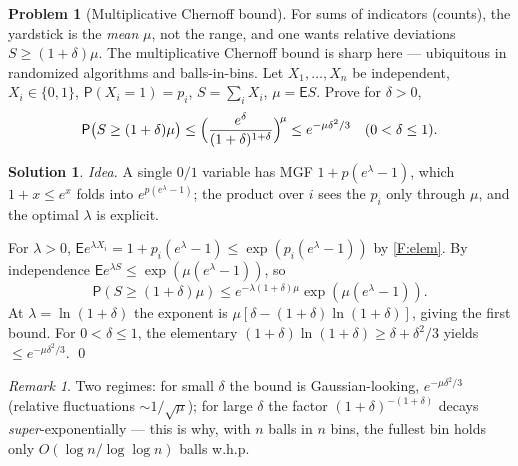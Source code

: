 \documentclass[14pt]{extarticle}
\theoremstyle{definition}
\newtheorem{exercise}{Problem}
\newtheorem*{solution}{Solution}
\theoremstyle{remark}
\newtheorem*{remark}{Remark}
\newcommand\expc{\mathsf{E}}
\newcommand\prb{\mathsf{P}}
\begin{document}
\begin{exercise}[Multiplicative Chernoff bound]\label{prob:multcher}
For sums of indicators (counts), the yardstick is the \emph{mean} $\mu$, not the range, and one wants relative deviations $S\ge(1+\delta)\mu$. The multiplicative Chernoff bound is sharp here --- ubiquitous in randomized algorithms and balls-in-bins. Let $X_1,\ldots,X_n$ be independent, $X_i\in\{0,1\}$, $\prb(X_i=1)=p_i$, $S=\sum_iX_i$, $\mu=\expc S$. Prove for $\delta>0$,
\[
\prb\bigl(S\ge(1+\delta)\mu\bigr)\le\Bigl(\frac{e^\delta}{(1+\delta)^{1+\delta}}\Bigr)^{\!\mu}\le e^{-\mu\delta^2/3}\quad(0<\delta\le1).
\]
\end{exercise}
\begin{solution}
\emph{Idea.} A single $0/1$ variable has MGF $1+p(e^\lambda-1)$, which $1+x\le e^x$ folds into $e^{p(e^\lambda-1)}$; the product over $i$ sees the $p_i$ only through $\mu$, and the optimal $\lambda$ is explicit.

For $\lambda>0$, $\expc e^{\lambda X_i}=1+p_i(e^\lambda-1)\le\exp(p_i(e^\lambda-1))$ by \ref{F:elem}. By independence $\expc e^{\lambda S}\le\exp(\mu(e^\lambda-1))$, so
\[
\prb(S\ge(1+\delta)\mu)\le e^{-\lambda(1+\delta)\mu}\exp(\mu(e^\lambda-1)).
\]
At $\lambda=\ln(1+\delta)$ the exponent is $\mu[\delta-(1+\delta)\ln(1+\delta)]$, giving the first bound. For $0<\delta\le1$, the elementary $(1+\delta)\ln(1+\delta)\ge\delta+\delta^2/3$ yields $\le e^{-\mu\delta^2/3}$. \qed
\end{solution}
\begin{remark}
Two regimes: for small $\delta$ the bound is Gaussian-looking, $e^{-\mu\delta^2/3}$ (relative fluctuations $\sim1/\sqrt\mu$); for large $\delta$ the factor $(1+\delta)^{-(1+\delta)}$ decays \emph{super}-exponentially --- this is why, with $n$ balls in $n$ bins, the fullest bin holds only $O(\log n/\log\log n)$ balls w.h.p.
\end{remark}
\end{document}
